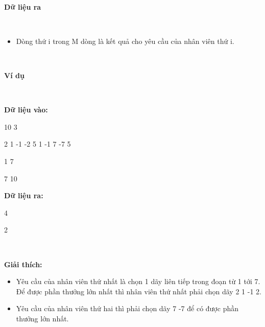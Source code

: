  

\textbf{Dữ liệu ra}

 
\begin{itemize}
	\item Dòng thứ i trong M dòng là kết quả cho yêu cầu của nhân viên thứ i.
\end{itemize}

 

\textbf{Ví dụ}

 

\textbf{Dữ liệu vào:}

10 3

2 1 -1 -2 5 1 -1 7 -7 5

1 7

7 10




\textbf{Dữ liệu ra:}

4

2

 

\textbf{Giải thích:}
\begin{itemize}
	\item Yêu cầu của nhân viên thứ nhất là chọn 1 dãy liên tiếp trong đoạn từ 1 tới 7. Để được phần thưởng lớn nhất thì nhân viên thứ nhất phải chọn dãy 2 1 -1 2.
	\item Yêu cầu của nhân viên thứ hai thì phải chọn dãy 7 -7 để có được phần thưởng lớn nhất.
\end{itemize}

 

 

 
\begin{itemize}
\end{itemize}
\begin{itemize}
\end{itemize}
